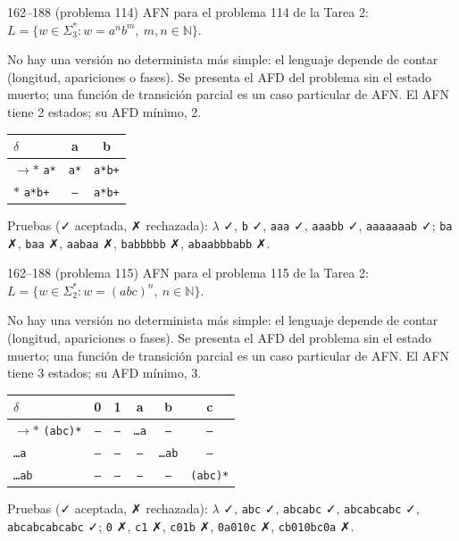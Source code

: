 \documentclass[11pt]{article}
\begin{document}
\begin{ejercicio}{162--188 (problema 114)}{}
AFN para el problema 114 de la Tarea 2: $L = \{w \in \Sigma_3^* : w = a^n b^m,\ m, n \in \mathbb{N}\}$.
\end{ejercicio}
\proc No hay una versión no determinista más simple: el lenguaje depende de contar (longitud, apariciones o fases). Se presenta el AFD del problema sin el estado muerto; una función de transición parcial es un caso particular de AFN. El AFN tiene 2 estados; su AFD mínimo, 2.
\begin{center}\small\begin{tabular}{lcc}\toprule
$\delta$ & a & b \\\midrule
$\to$$*$ \texttt{a*} & \texttt{a*} & \texttt{a*b+} \\
$*$ \texttt{a*b+} & \texttt{--} & \texttt{a*b+} \\
\bottomrule\end{tabular}\end{center}
Pruebas (✓ aceptada, ✗ rechazada): $\lambda$ ✓, \texttt{b} ✓, \texttt{aaa} ✓, \texttt{aaabb} ✓, \texttt{aaaaaaab} ✓; \texttt{ba} ✗, \texttt{baa} ✗, \texttt{aabaa} ✗, \texttt{babbbbb} ✗, \texttt{abaabbbabb} ✗.



\begin{ejercicio}{162--188 (problema 115)}{}
AFN para el problema 115 de la Tarea 2: $L = \{w \in \Sigma_2^* : w = (abc)^n,\ n \in \mathbb{N}\}$.
\end{ejercicio}
\proc No hay una versión no determinista más simple: el lenguaje depende de contar (longitud, apariciones o fases). Se presenta el AFD del problema sin el estado muerto; una función de transición parcial es un caso particular de AFN. El AFN tiene 3 estados; su AFD mínimo, 3.
\begin{center}\small\begin{tabular}{lccccc}\toprule
$\delta$ & 0 & 1 & a & b & c \\\midrule
$\to$$*$ \texttt{(abc)*} & \texttt{--} & \texttt{--} & \texttt{…a} & \texttt{--} & \texttt{--} \\
 \texttt{…a} & \texttt{--} & \texttt{--} & \texttt{--} & \texttt{…ab} & \texttt{--} \\
 \texttt{…ab} & \texttt{--} & \texttt{--} & \texttt{--} & \texttt{--} & \texttt{(abc)*} \\
\bottomrule\end{tabular}\end{center}
Pruebas (✓ aceptada, ✗ rechazada): $\lambda$ ✓, \texttt{abc} ✓, \texttt{abcabc} ✓, \texttt{abcabcabc} ✓, \texttt{abcabcabcabc} ✓; \texttt{0} ✗, \texttt{c1} ✗, \texttt{c01b} ✗, \texttt{0a010c} ✗, \texttt{cb010bc0a} ✗.
\end{document}
